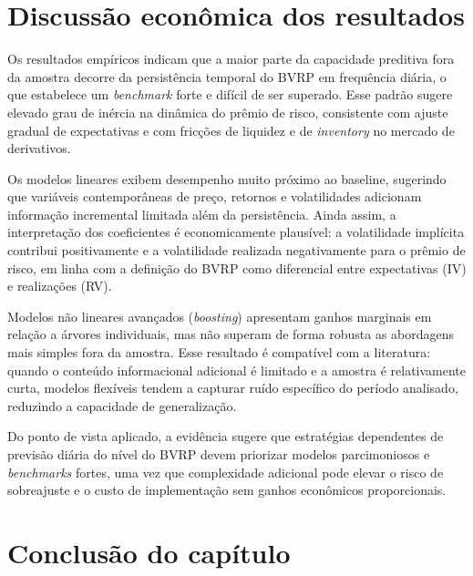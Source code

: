 \section{Discussão econômica dos resultados}
\label{sec:cap6_discussion}

Os resultados empíricos indicam que a maior parte da capacidade preditiva fora da
amostra decorre da persistência temporal do BVRP em frequência diária, o que
estabelece um \textit{benchmark} forte e difícil de ser superado. Esse padrão sugere
elevado grau de inércia na dinâmica do prêmio de risco, consistente com ajuste
gradual de expectativas e com fricções de liquidez e de \textit{inventory} no
mercado de derivativos.

Os modelos lineares exibem desempenho muito próximo ao baseline, sugerindo que
variáveis contemporâneas de preço, retornos e volatilidades adicionam informação
incremental limitada além da persistência. Ainda assim, a interpretação dos
coeficientes é economicamente plausível: a volatilidade implícita contribui
positivamente e a volatilidade realizada negativamente para o prêmio de risco, em
linha com a definição do BVRP como diferencial entre expectativas (IV) e
realizações (RV).

Modelos não lineares avançados (\textit{boosting}) apresentam ganhos marginais em
relação a árvores individuais, mas não superam de forma robusta as abordagens mais
simples fora da amostra. Esse resultado é compatível com a literatura: quando o
conteúdo informacional adicional é limitado e a amostra é relativamente curta,
modelos flexíveis tendem a capturar ruído específico do período analisado, reduzindo
a capacidade de generalização.

Do ponto de vista aplicado, a evidência sugere que estratégias dependentes de
previsão diária do nível do BVRP devem priorizar modelos parcimoniosos e
\textit{benchmarks} fortes, uma vez que complexidade adicional pode elevar o risco
de sobreajuste e o custo de implementação sem ganhos econômicos proporcionais.

\section{Conclusão do capítulo}
\label{sec:cap6_conclusion}

